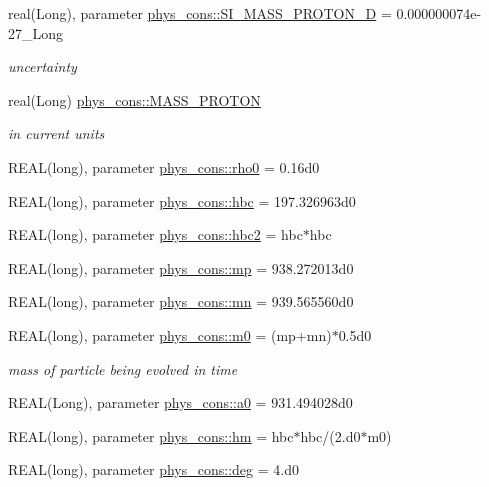 \begin{DoxyCompactItemize}
real(Long), parameter \hyperlink{namespacephys__cons_a3c37a18a918519962cfc26597082d53d}{phys\_\-cons::SI\_\-MASS\_\-PROTON\_\-D} = 0.000000074e-\/27\_\-Long
\begin{DoxyCompactList}\small\item\em uncertainty \item\end{DoxyCompactList}\item 
real(Long) \hyperlink{namespacephys__cons_a20e8ed3d7ff389588ce024048c5ccf85}{phys\_\-cons::MASS\_\-PROTON}
\begin{DoxyCompactList}\small\item\em in current units \item\end{DoxyCompactList}\item 
REAL(long), parameter \hyperlink{namespacephys__cons_a4b10513970a98ad78b85723c60d9a8b6}{phys\_\-cons::rho0} = 0.16d0
\item 
REAL(long), parameter \hyperlink{namespacephys__cons_a2d3539e3579b581a4e69eff7347b4fa2}{phys\_\-cons::hbc} = 197.326963d0
\item 
REAL(long), parameter \hyperlink{namespacephys__cons_a030a10874bc73b7d042adb32fad75614}{phys\_\-cons::hbc2} = hbc$\ast$hbc
\item 
REAL(long), parameter \hyperlink{namespacephys__cons_ae2a4cb4e421fe399f19d0729b5617fed}{phys\_\-cons::mp} = 938.272013d0
\item 
REAL(long), parameter \hyperlink{namespacephys__cons_ad68aaba74b75e1e13f1367c1eb0904c1}{phys\_\-cons::mn} = 939.565560d0
\item 
REAL(long), parameter \hyperlink{namespacephys__cons_afa35c20a6e2a70b58142d10071eeef10}{phys\_\-cons::m0} = (mp+mn)$\ast$0.5d0
\begin{DoxyCompactList}\small\item\em mass of particle being evolved in time \item\end{DoxyCompactList}\item 
REAL(Long), parameter \hyperlink{namespacephys__cons_a02e8bb2c808e0085a317bf36ff79ae2a}{phys\_\-cons::a0} = 931.494028d0
\item 
REAL(long), parameter \hyperlink{namespacephys__cons_ad97ad749ef4f8f66c56a0facb7394cb5}{phys\_\-cons::hm} = hbc$\ast$hbc/(2.d0$\ast$m0)
\item 
REAL(long), parameter \hyperlink{namespacephys__cons_a553e3e17652770308e6bffcb8fcb5a95}{phys\_\-cons::deg} = 4.d0
\end{DoxyCompactItemize}
